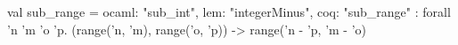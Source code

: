 val sub_range = {ocaml: "sub_int", lem: "integerMinus", coq: "sub_range"} : forall 'n 'm 'o 'p.
  (range('n, 'm), range('o, 'p)) -> range('n - 'p, 'm - 'o)
